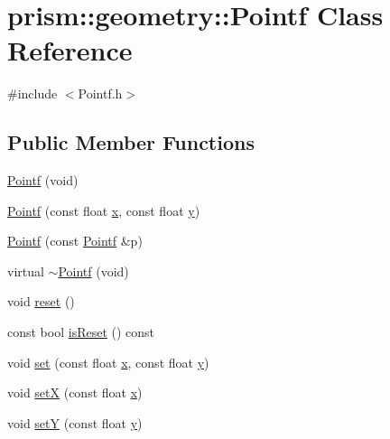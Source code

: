 \hypertarget{classprism_1_1geometry_1_1_pointf}{}\section{prism\+:\+:geometry\+:\+:Pointf Class Reference}
\label{classprism_1_1geometry_1_1_pointf}


{\ttfamily \#include $<$Pointf.\+h$>$}

\subsection*{Public Member Functions}
\begin{DoxyCompactItemize}
\item 
\hyperlink{classprism_1_1geometry_1_1_pointf_a209ffb2cdac4a4e42a3e95d663f74571}{Pointf} (void)
\item 
\hyperlink{classprism_1_1geometry_1_1_pointf_a5db73589866c842fceffa6e254831878}{Pointf} (const float \hyperlink{classprism_1_1geometry_1_1_pointf_a2b05b92db0060a90deb6478838abe718}{x}, const float \hyperlink{classprism_1_1geometry_1_1_pointf_aad05c69bc2f5496489e1095d84b1508c}{y})
\item 
\hyperlink{classprism_1_1geometry_1_1_pointf_a1be17398115b4ea3ec18f0dcd8e5f737}{Pointf} (const \hyperlink{classprism_1_1geometry_1_1_pointf}{Pointf} \&p)
\item 
virtual \hyperlink{classprism_1_1geometry_1_1_pointf_ab5ab09dd41e203a47c7457f79a6a05f5}{$\sim$\+Pointf} (void)
\item 
void \hyperlink{classprism_1_1geometry_1_1_pointf_a77f8ef854b7f802ec97d315662176943}{reset} ()
\item 
const bool \hyperlink{classprism_1_1geometry_1_1_pointf_a54afc97d4544f8972a9af0eb4753410b}{is\+Reset} () const 
\item 
void \hyperlink{classprism_1_1geometry_1_1_pointf_aa5d27efca6ed6a9feb0daed15fd2e63e}{set} (const float \hyperlink{classprism_1_1geometry_1_1_pointf_a2b05b92db0060a90deb6478838abe718}{x}, const float \hyperlink{classprism_1_1geometry_1_1_pointf_aad05c69bc2f5496489e1095d84b1508c}{y})
\item 
void \hyperlink{classprism_1_1geometry_1_1_pointf_ab0e9d5a509b913987570cd614c7401cf}{setX} (const float \hyperlink{classprism_1_1geometry_1_1_pointf_a2b05b92db0060a90deb6478838abe718}{x})
\item 
void \hyperlink{classprism_1_1geometry_1_1_pointf_a40ef84a0d754374e84f89e8c28a8c9ff}{setY} (const float \hyperlink{classprism_1_1geometry_1_1_pointf_aad05c69bc2f5496489e1095d84b1508c}{y})

\end{DoxyCompactItemize}
